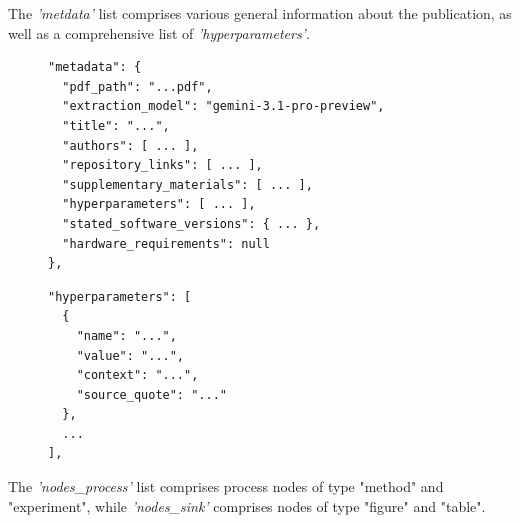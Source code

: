 \documentclass{article}
\begin{document}
\newpage
The \textit{'metdata'} list comprises various general information about the publication, as well as a comprehensive list of \textit{'hyperparameters'}.
\begin{figure}[ht]
\noindent
\begin{minipage}[t]{0.6\textwidth}
\begin{lstlisting}[basicstyle=\ttfamily\small, frame=single]
"metadata": {
  "pdf_path": "...pdf",
  "extraction_model": "gemini-3.1-pro-preview",
  "title": "...",
  "authors": [ ... ],
  "repository_links": [ ... ],
  "supplementary_materials": [ ... ],
  "hyperparameters": [ ... ],
  "stated_software_versions": { ... },
  "hardware_requirements": null
},
\end{lstlisting}
\end{minipage}\hfill
\begin{minipage}[t]{0.39\textwidth}
\begin{lstlisting}[basicstyle=\ttfamily\small, frame=single]
"hyperparameters": [
  {
    "name": "...",
    "value": "...",
    "context": "...",
    "source_quote": "..."
  },
  ...
],
\end{lstlisting}
\end{minipage}
\end{figure}

\FloatBarrier

The \textit{'nodes\_process'} list comprises process nodes of type "method" and "experiment", while \textit{'nodes\_sink'} comprises nodes of type "figure" and "table".
\end{document}
